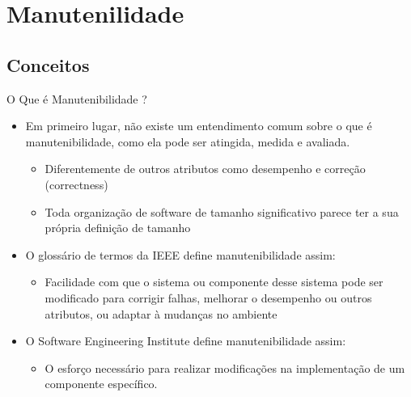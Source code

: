 \section{Manutenilidade}
\subsection{Conceitos}
\begin{frame}{O Que é Manutenibilidade ?}
    \begin{itemize}
      \item Em primeiro lugar, não existe um entendimento comum sobre o que é manutenibilidade, como
        ela pode ser atingida, medida e avaliada.
      \begin{itemize}
        \item Diferentemente de outros atributos como desempenho e correção (correctness)
        \item Toda organização de software de tamanho significativo parece ter a sua própria definição
        de tamanho
      \end{itemize}

      \item O glossário de termos da IEEE define \alert{manutenibilidade} assim:
      \begin{itemize}
        \item Facilidade com que o sistema ou componente desse sistema pode ser modificado para corrigir falhas, 
        melhorar o desempenho ou outros atributos, ou adaptar à mudanças no ambiente
      \end{itemize}
       
      \item O Software Engineering Institute define \alert{manutenibilidade} assim:
      \begin{itemize}
        \item O esforço necessário para realizar modificações na implementação de um componente específico.
      \end{itemize}
      

\end{itemize}
\end{frame}
